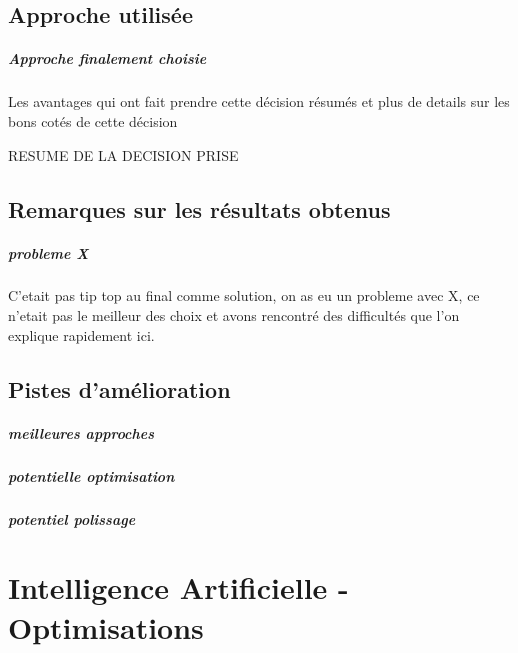 	\section{Approche utilisée}
	
		\paragraph{Approche finalement choisie}
		Les avantages qui ont fait prendre cette décision résumés et plus de details sur les bons cotés de cette décision
	
		\begin{result}
			RESUME DE LA DECISION PRISE
		\end{result}
		
	\section{Remarques sur les résultats obtenus}
	
		\paragraph{probleme X}
		C'etait pas tip top au final comme solution, on as eu un probleme avec X, ce n'etait pas le meilleur des choix et avons rencontré des difficultés que l'on explique rapidement ici.
		
	\section{Pistes d'amélioration}
	
		\paragraph{meilleures approches}
		
		\paragraph{potentielle optimisation}
		
		\paragraph{potentiel polissage}
		
\chapter{Intelligence Artificielle - Optimisations}
	
